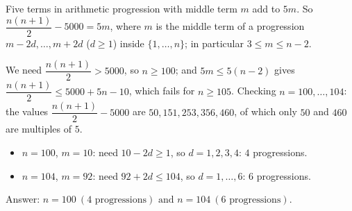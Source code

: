 Five terms in arithmetic progression with middle term $m$ add to $5m$. So $\dfrac{n(n+1)}{2}-5000=5m$, where $m$ is the middle term of a progression $m-2d,\dots,m+2d$ ($d\ge1$) inside $\{1,\dots,n\}$; in particular $3\le m\le n-2$.

We need $\dfrac{n(n+1)}{2}>5000$, so $n\ge100$; and $5m\le5(n-2)$ gives $\dfrac{n(n+1)}{2}\le5000+5n-10$, which fails for $n\ge105$. Checking $n=100,\dots,104$: the values $\dfrac{n(n+1)}{2}-5000$ are $50,151,253,356,460$, of which only $50$ and $460$ are multiples of $5$.
\begin{itemize}
\item $n=100$, $m=10$: need $10-2d\ge1$, so $d=1,2,3,4$: $4$ progressions.
\item $n=104$, $m=92$: need $92+2d\le104$, so $d=1,\dots,6$: $6$ progressions.
\end{itemize}
Answer: $\boxed{n=100\ (4\text{ progressions})\text{ and }n=104\ (6\text{ progressions})}$.
